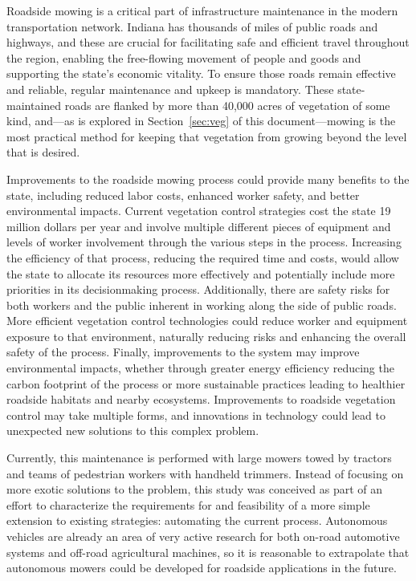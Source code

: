 \documentclass[
]{article}
\begin{document}
Roadside mowing is a critical part of infrastructure maintenance in the
modern transportation network. Indiana has thousands of miles of public
roads and highways, and these are crucial for facilitating safe and
efficient travel throughout the region, enabling the free-flowing
movement of people and goods and supporting the state's economic
vitality. To ensure those roads remain effective and reliable, regular
maintenance and upkeep is mandatory. These state-maintained roads are
flanked by more than 40,000 acres of vegetation of some kind, and---as
is explored in Section~\ref{sec:veg} of this document---mowing is the
most practical method for keeping that vegetation from growing beyond
the level that is desired.

Improvements to the roadside mowing process could provide many benefits
to the state, including reduced labor costs, enhanced worker safety, and
better environmental impacts. Current vegetation control strategies cost
the state 19 million dollars per year and involve multiple different
pieces of equipment and levels of worker involvement through the various
steps in the process. Increasing the efficiency of that process,
reducing the required time and costs, would allow the state to allocate
its resources more effectively and potentially include more priorities
in its decisionmaking process. Additionally, there are safety risks for
both workers and the public inherent in working along the side of public
roads. More efficient vegetation control technologies could reduce
worker and equipment exposure to that environment, naturally reducing
risks and enhancing the overall safety of the process. Finally,
improvements to the system may improve environmental impacts, whether
through greater energy efficiency reducing the carbon footprint of the
process or more sustainable practices leading to healthier roadside
habitats and nearby ecosystems. Improvements to roadside vegetation
control may take multiple forms, and innovations in technology could
lead to unexpected new solutions to this complex problem.

Currently, this maintenance is performed with large mowers towed by
tractors and teams of pedestrian workers with handheld trimmers. Instead
of focusing on more exotic solutions to the problem, this study was
conceived as part of an effort to characterize the requirements for and
feasibility of a more simple extension to existing strategies:
automating the current process. Autonomous vehicles are already an area
of very active research for both on-road automotive systems and off-road
agricultural machines, so it is reasonable to extrapolate that
autonomous mowers could be developed for roadside applications in the
future.
\end{document}
